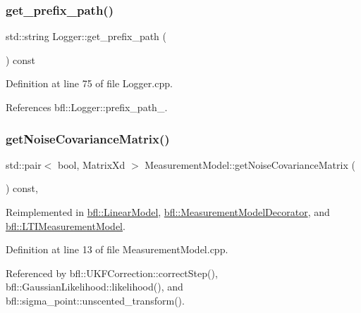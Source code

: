 \subsubsection{\texorpdfstring{get\+\_\+prefix\+\_\+path()}{get\_prefix\_path()}}
{\footnotesize\ttfamily std\+::string Logger\+::get\+\_\+prefix\+\_\+path (\begin{DoxyParamCaption}{ }\end{DoxyParamCaption}) const\hspace{0.3cm}{\ttfamily [inherited]}}



Definition at line 75 of file Logger.\+cpp.



References bfl\+::\+Logger\+::prefix\+\_\+path\+\_\+.

\mbox{\label{classbfl_1_1MeasurementModel_af25f42076b69e0c6cab47d36d796536f}} 
\subsubsection{\texorpdfstring{get\+Noise\+Covariance\+Matrix()}{getNoiseCovarianceMatrix()}}
{\footnotesize\ttfamily std\+::pair$<$ bool, Matrix\+Xd $>$ Measurement\+Model\+::get\+Noise\+Covariance\+Matrix (\begin{DoxyParamCaption}{ }\end{DoxyParamCaption}) const\hspace{0.3cm}{\ttfamily [virtual]}, {\ttfamily [inherited]}}



Reimplemented in \mbox{\hyperlink{classbfl_1_1LinearModel_a9adc7aabd58e79ce71c283866ddbf655}{bfl\+::\+Linear\+Model}}, \mbox{\hyperlink{classbfl_1_1MeasurementModelDecorator_a690917b537b72bd6278968bbd5b030b0}{bfl\+::\+Measurement\+Model\+Decorator}}, and \mbox{\hyperlink{classbfl_1_1LTIMeasurementModel_a227ed150a9fdcb2b5b59f7b71eb7e462}{bfl\+::\+L\+T\+I\+Measurement\+Model}}.



Definition at line 13 of file Measurement\+Model.\+cpp.



Referenced by bfl\+::\+U\+K\+F\+Correction\+::correct\+Step(), bfl\+::\+Gaussian\+Likelihood\+::likelihood(), and bfl\+::sigma\+\_\+point\+::unscented\+\_\+transform().

